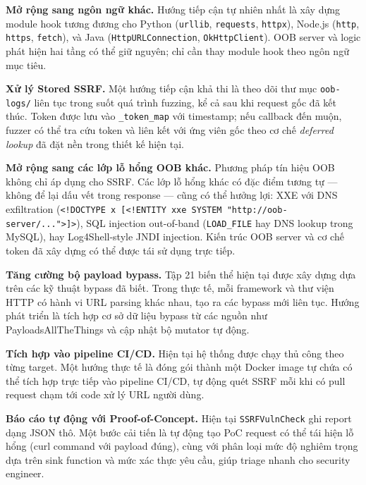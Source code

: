 \textbf{Mở rộng sang ngôn ngữ khác.} Hướng tiếp cận tự nhiên nhất
là xây dựng module hook tương đương cho Python (\texttt{urllib},
\texttt{requests}, \texttt{httpx}), Node.js (\texttt{http},
\texttt{https}, \texttt{fetch}), và Java (\texttt{HttpURLConnection},
\texttt{OkHttpClient}). OOB server và logic phát hiện hai tầng có thể
giữ nguyên; chỉ cần thay module hook theo ngôn ngữ mục tiêu.

\textbf{Xử lý Stored SSRF.} Một hướng tiếp cận khả thi là theo dõi
thư mục \texttt{oob-logs/} liên tục trong suốt quá trình fuzzing, kể
cả sau khi request gốc đã kết thúc. Token được lưu vào
\texttt{\_token\_map} với timestamp; nếu callback đến muộn, fuzzer
có thể tra cứu token và liên kết với ứng viên gốc theo cơ chế
\textit{deferred lookup} đã đặt nền trong thiết kế hiện tại.

\textbf{Mở rộng sang các lớp lỗ hổng OOB khác.} Phương pháp tín hiệu
OOB không chỉ áp dụng cho SSRF. Các lớp lỗ hổng khác có đặc điểm
tương tự --- không để lại dấu vết trong response --- cũng có thể hưởng
lợi: XXE với DNS exfiltration (\texttt{<!DOCTYPE x [<!ENTITY xxe
SYSTEM "http://oob-server/...">]>}), SQL injection out-of-band
(\texttt{LOAD\_FILE} hay DNS lookup trong MySQL), hay Log4Shell-style
JNDI injection. Kiến trúc OOB server và cơ chế token đã xây dựng có
thể được tái sử dụng trực tiếp.

\textbf{Tăng cường bộ payload bypass.} Tập 21 biến thể hiện tại được
xây dựng dựa trên các kỹ thuật bypass đã biết. Trong thực tế, mỗi
framework và thư viện HTTP có hành vi URL parsing khác nhau, tạo ra
các bypass mới liên tục. Hướng phát triển là tích hợp cơ sở dữ liệu
bypass từ các nguồn như PayloadsAllTheThings và cập nhật bộ mutator
tự động.

\textbf{Tích hợp vào pipeline CI/CD.} Hiện tại hệ thống được chạy
thủ công theo từng target. Một hướng thực tế là đóng gói thành một
Docker image tự chứa có thể tích hợp trực tiếp vào pipeline CI/CD,
tự động quét SSRF mỗi khi có pull request chạm tới code xử lý URL
người dùng.

\textbf{Báo cáo tự động với Proof-of-Concept.} Hiện tại \texttt{SSRFVulnCheck}
ghi report dạng JSON thô. Một bước cải tiến là tự động tạo PoC request
có thể tái hiện lỗ hổng (curl command với payload đúng), cùng với phân
loại mức độ nghiêm trọng dựa trên sink function và mức xác thực yêu
cầu, giúp triage nhanh cho security engineer.
